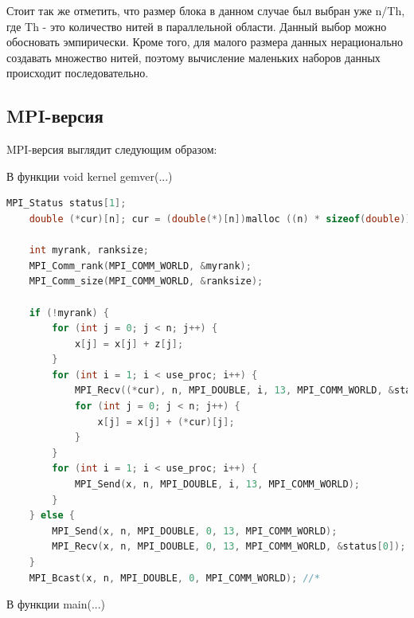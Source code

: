 \documentclass{article}
\begin{document}
Стоит так же отметить, что размер блока в данном случае был выбран уже n/Th, где Th - это количество нитей в параллельной области. Данный выбор можно обосновать эмпирически. Кроме того, для малого размера данных нерационально создавать множество нитей, поэтому вычисление маленьких наборов данных происходит последовательно.

\subsection{MPI-версия}

MPI-версия выглядит следующим образом:

\vspace{0.5cm}
В функции void kernel gemver(...)

\begin{lstlisting}[language = C]
    MPI_Status status[1];
    double (*cur)[n]; cur = (double(*)[n])malloc ((n) * sizeof(double));

    int myrank, ranksize;
    MPI_Comm_rank(MPI_COMM_WORLD, &myrank);
    MPI_Comm_size(MPI_COMM_WORLD, &ranksize);

    if (!myrank) {
        for (int j = 0; j < n; j++) {
            x[j] = x[j] + z[j];
        }
        for (int i = 1; i < use_proc; i++) {
            MPI_Recv((*cur), n, MPI_DOUBLE, i, 13, MPI_COMM_WORLD, &status[0]);
            for (int j = 0; j < n; j++) {
                x[j] = x[j] + (*cur)[j];
            }
        }
        for (int i = 1; i < use_proc; i++) {                           //for use * comment it
            MPI_Send(x, n, MPI_DOUBLE, i, 13, MPI_COMM_WORLD);         //for use * comment it
        }                                                              //for use * comment it
    } else {
        MPI_Send(x, n, MPI_DOUBLE, 0, 13, MPI_COMM_WORLD);
        MPI_Recv(x, n, MPI_DOUBLE, 0, 13, MPI_COMM_WORLD, &status[0]); //for use * comment it
    }
    MPI_Bcast(x, n, MPI_DOUBLE, 0, MPI_COMM_WORLD); //*
\end{lstlisting}

\vspace{0.5cm}
В функции main(...)
\end{document}
